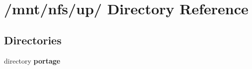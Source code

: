 \section{/mnt/nfs/up/ Directory Reference}
\label{dir_39227c2caa4dcaf57c6bdbbe0a0469c0}
\subsection*{Directories}
\begin{CompactItemize}
\item 
directory \bf{portage}
\end{CompactItemize}
